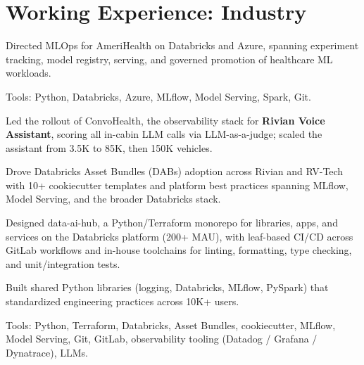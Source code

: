 \documentclass[]{template}
\begin{document}
\sectionsep%

\sectionsep
\section{Working Experience: Industry}

\sectionsep
{}

\vspace{\topsep}

\begin{tightemize}
\item Directed MLOps for AmeriHealth on Databricks and Azure, spanning experiment tracking, model registry, serving, and governed promotion of healthcare ML workloads.

\item Tools: Python, Databricks, Azure, MLflow, Model Serving, Spark, Git.
\end{tightemize}
\sectionsep

\sectionsep
{}

\vspace{\topsep}

\begin{tightemize}
\item Led the rollout of ConvoHealth, the observability stack for \textbf{Rivian Voice Assistant}, scoring all in-cabin LLM calls via LLM-as-a-judge; scaled the assistant from 3.5K to 85K, then 150K vehicles.

\item Drove Databricks Asset Bundles (DABs) adoption across Rivian and RV-Tech with 10+ cookiecutter templates and platform best practices spanning MLflow, Model Serving, and the broader Databricks stack.

\item Designed data-ai-hub, a Python/Terraform monorepo for libraries, apps, and services on the Databricks platform (200+ MAU), with leaf-based CI/CD across GitLab workflows and in-house toolchains for linting, formatting, type checking, and unit/integration tests.

\item Built shared Python libraries (logging, Databricks, MLflow, PySpark) that standardized engineering practices across 10K+ users.

\item Tools: Python, Terraform, Databricks, Asset Bundles, cookiecutter, MLflow, Model Serving, Git, GitLab, observability tooling (Datadog / Grafana / Dynatrace), LLMs.
\end{tightemize}
\sectionsep
\end{document}
